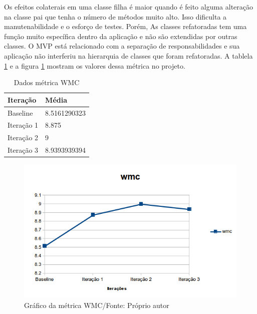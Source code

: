 Os efeitos colaterais em uma classe filha é maior quando é feito alguma
alteração na classe pai que tenha o número de métodos muito alto\cite{cksuite}.
Isso dificulta a manutenabilidade e o esforço de testes. Porém, As classes
refatoradas tem uma função muito específica dentro da aplicação e não são
extendidas por outras classes. O MVP está relacionado com a separação de
responsabilidades e sua aplicação não interferiu na hierarquia de classes que
foram refatoradas.
A tablela \ref{tab:wmc} e a figura \ref{fig:wmc} mostram os valores dessa
métrica no projeto.


\begin{table}[h]
	\centering
	\caption{Dados métrica WMC}
    \begin{tabular}{ | l | l | }
    \hline
    Iteração & Média 			\\ \hline
    Baseline & 8.5161290323   	\\ \hline
    Iteração 1 & 8.875			\\ \hline
	Iteração 2 & 9				\\ \hline
	Iteração 3 & 8.9393939394	\\ \hline
    \end{tabular}
    
    \label{tab:wmc}
\end{table}

\begin{figure}[h]
	\centering
	\includegraphics{img/wmc.png}
	\caption{Gráfico da métrica WMC/Fonte: Próprio autor} 
	\label{fig:wmc}
\end{figure}


